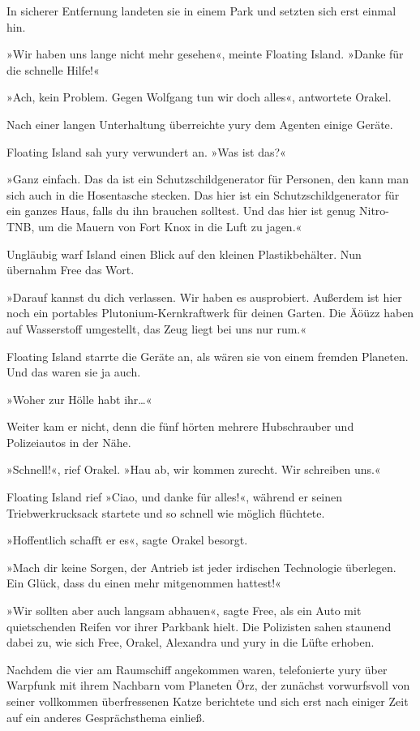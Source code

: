 In sicherer Entfernung landeten sie in einem Park und setzten sich erst einmal hin.

»Wir haben uns lange nicht mehr gesehen«, meinte Floating Island. »Danke für die schnelle Hilfe!«

»Ach, kein Problem. Gegen Wolfgang tun wir doch alles«, antwortete Orakel.

Nach einer langen Unterhaltung überreichte yury dem Agenten einige Geräte.

Floating Island sah yury verwundert an. »Was ist das?«

»Ganz einfach. Das da ist ein Schutzschildgenerator für Personen, den kann man sich auch in die Hosentasche stecken. Das hier ist ein Schutzschildgenerator für ein ganzes Haus, falls du ihn brauchen solltest. Und das hier ist genug Nitro-TNB, um die Mauern von Fort Knox in die Luft zu jagen.«

Ungläubig warf Island einen Blick auf den kleinen Plastikbehälter. Nun übernahm Free das Wort.

»Darauf kannst du dich verlassen. Wir haben es ausprobiert. Außerdem ist hier noch ein portables Plutonium-Kernkraftwerk für deinen Garten. Die Äöüzz haben auf Wasserstoff umgestellt, das Zeug liegt bei uns nur rum.«

Floating Island starrte die Geräte an, als wären sie von einem fremden Planeten. Und das waren sie ja auch.

»Woher zur Hölle habt ihr…«

Weiter kam er nicht, denn die fünf hörten mehrere Hubschrauber und Polizeiautos in der Nähe.

»Schnell!«, rief Orakel. »Hau ab, wir kommen zurecht. Wir schreiben uns.«

Floating Island rief »Ciao, und danke für alles!«, während er seinen Triebwerkrucksack startete und so schnell wie möglich flüchtete.

»Hoffentlich schafft er es«, sagte Orakel besorgt.

»Mach dir keine Sorgen, der Antrieb ist jeder irdischen Technologie überlegen. Ein Glück, dass du einen mehr mitgenommen hattest!«

»Wir sollten aber auch langsam abhauen«, sagte Free, als ein Auto mit quietschenden Reifen vor ihrer Parkbank hielt. Die Polizisten sahen staunend dabei zu, wie sich Free, Orakel, Alexandra und yury in die Lüfte erhoben.

Nachdem die vier am Raumschiff angekommen waren, telefonierte yury über Warpfunk mit ihrem Nachbarn vom Planeten Örz, der zunächst vorwurfsvoll von seiner vollkommen überfressenen Katze berichtete und sich erst nach einiger Zeit auf ein anderes Gesprächsthema einließ.

